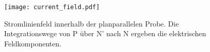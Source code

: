 \begin{figure}[h]
\centering
\texttt{[image: current\_field.pdf]}
\caption[Stromlinienfeld innerhalb der planparallelen Probe.]{Stromlinienfeld innerhalb der planparallelen Probe. Die Integrationswege von P über N' nach N ergeben die elektrischen Feldkomponenten.}
\label{fig:current_field}
\end{figure}